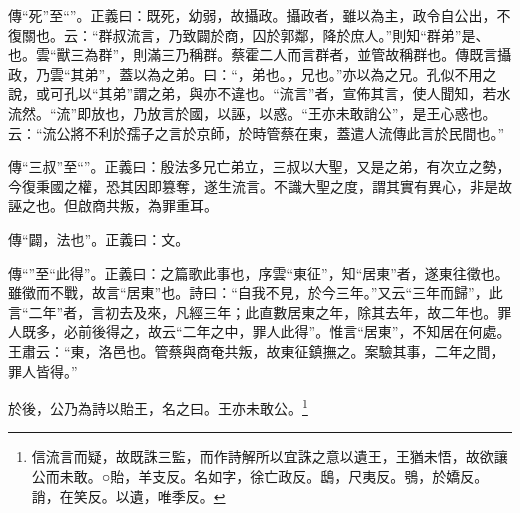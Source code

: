 {\noindent\zhuan{}\fzbyks 傳“死”至“”。正義曰：既死，幼弱，故攝政。攝政者，雖以為主，政令自公出，不復關也。云：“群叔流言，乃致闢於商，囚於郭鄰，降於庶人。”則知“群弟”是、也。雲“獸三為群”，則滿三乃稱群。蔡霍二人而言群者，並管故稱群也。傳既言攝政，乃雲“其弟”，蓋以為之弟。曰：“，弟也。，兄也。”亦以為之兄。孔似不用之說，或可孔以“其弟”謂之弟，與亦不違也。“流言”者，宣佈其言，使人聞知，若水流然。“流”即放也，乃放言於國，以誣，以惑。“王亦未敢誚公”，是王心惑也。云：“流公將不利於孺子之言於京師，於時管蔡在東，蓋遣人流傳此言於民間也。” \par}

{\noindent\zhuan{}\fzbyks 傳“三叔”至“”。正義曰：殷法多兄亡弟立，三叔以大聖，又是之弟，有次立之勢，今復秉國之權，恐其因即篡奪，遂生流言。不識大聖之度，謂其實有異心，非是故誣之也。但啟商共叛，為罪重耳。 \par}

{\noindent\zhuan{}\fzbyks 傳“闢，法也”。正義曰：文。 \par}

{\noindent\zhuan{}\fzbyks 傳“”至“此得”。正義曰：之篇歌此事也，序雲“東征”，知“居東”者，遂東往徵也。雖徵而不戰，故言“居東”也。詩曰：“自我不見，於今三年。”又云“三年而歸”，此言“二年”者，言初去及來，凡經三年；此直數居東之年，除其去年，故二年也。罪人既多，必前後得之，故云“二年之中，罪人此得”。惟言“居東”，不知居在何處。王肅云：“東，洛邑也。管蔡與商奄共叛，故東征鎮撫之。案驗其事，二年之間，罪人皆得。” \par}

於後，公乃為詩以貽王，名之曰。王亦未敢公。\footnote{信流言而疑，故既誅三監，而作詩解所以宜誅之意以遺王，王猶未悟，故欲讓公而未敢。○貽，羊支反。名如字，徐亡政反。鴟，尺夷反。鴞，於嬌反。誚，在笑反。以遺，唯季反。}

